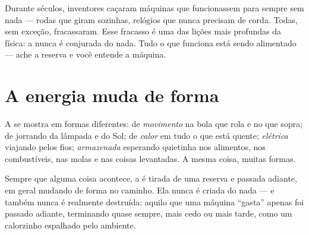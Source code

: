 \begin{remark}\label{rem:g5:everyday-energy:nofree}
Durante séculos, inventores caçaram máquinas que funcionassem para
sempre sem nada --- rodas que giram sozinhas, relógios que nunca
precisam de corda. Todas, sem exceção, fracassaram. Esse fracasso é
uma das lições mais profundas da física: a  nunca é
conjurada do nada. Tudo o que funciona está sendo alimentado --- ache
a reserva e você entende a máquina.
\end{remark}

\section{A energia muda de forma}

\begin{example}\label{ex:g5:everyday-energy:forms}
A  se mostra em formas diferentes:  de
\emph{movimento} na bola que rola e no  que sopra;  de
\emph{} jorrando da lâmpada e do Sol;  de \emph{calor} em
tudo o que está quente;  \emph{elétrica} viajando pelos fios;
 \emph{armazenada} esperando quietinha nos alimentos, nos
combustíveis, nas molas e nas coisas levantadas. A mesma coisa,
muitas formas.
\end{example}

\begin{proposition}\label{prop:g5:everyday-energy:chain}
Sempre que alguma coisa acontece, a  é tirada de uma reserva e
passada adiante, em geral mudando de forma no caminho. Ela nunca é
criada do nada --- e também nunca é realmente destruída: aquilo que
uma máquina ``gasta'' apenas foi passado adiante, terminando quase
sempre, mais cedo ou mais tarde, como um calorzinho espalhado pelo
ambiente.
\end{proposition}

